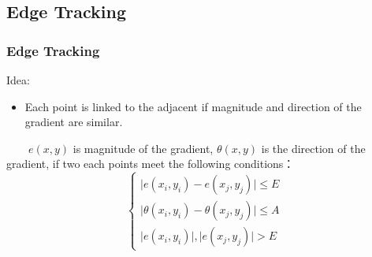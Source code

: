 \documentclass[notheorems,serif,table,compress]{beamer}  %
\begin{document}
\subsection{Edge Tracking}
\begin{frame}
\frametitle{Edge Tracking}
{\color{blue}Idea:}
\begin{itemize}
\item Each point is linked to the adjacent if magnitude and direction of the gradient are similar.\newline
\end{itemize}
\begin{tcolorbox}[colback=red!5,colframe=blue!75!black]
~~~~$e(x,y)$ is magnitude of the gradient, $\theta(x,y)$ is the direction of the gradient, if two each points meet the following conditions：
    \begin{displaymath}
        \left\{ \begin{array}{ll}
        \mid e(x_{i},y_{i})-e(x_{j},y_{j}) \mid \leq E\\
        \mid \theta(x_{i},y_{i})-\theta(x_{j},y_{j}) \mid \leq A\\
        \mid e(x_{i},y_{i}) \mid , \mid e(x_{j},y_{j}) \mid > E
         \end{array} \right.
\end{displaymath}
\end{tcolorbox}
\end{frame}

\begin{comment}
\subsection{Curve Fitting}
\begin{frame}
\frametitle{Curve Fitting}
Starting from a set of edge points, segments of a polygonal line are iteratively added until all the points are close enough to a segment.
    \begin{figure}
    \texttt{[image: duoni.png]} 
    \end{figure}
\end{frame}
\end{comment}
\end{document}
